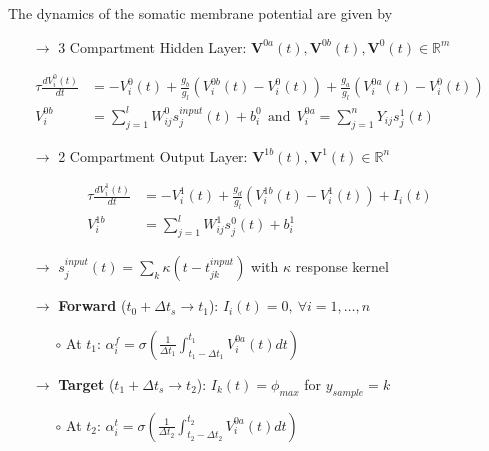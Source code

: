 \documentclass[colorinlistoftodos]{article}
\theoremstyle{definition}
\def\R{\mathbb{R}}
\begin{document}
The dynamics of the somatic membrane potential are given by

\begin{itemize}
	\item[$\to$] 3 Compartment Hidden Layer: $\mathbf{V}^{0a}(t), \mathbf{V}^{0b}(t), \mathbf{V}^{0}(t) \in \R^m$
\end{itemize}	
	\begin{align*}
		\tau \frac{dV_i^0(t)}{dt} &= -V_i^0(t) + \frac{g_b}{g_l}\left(V_i^{0b}(t) - V_i^0(t)\right) +\frac{g_a}{g_l}\left(V_i^{0a}(t) - V_i^0(t)\right)\\
		V_i^{0b} &= \sum_{j=1}^l W_{ij}^0 s_j^{input}(t) + b_i^0 \ \ \text{and} \ \ V_i^{0a} = \sum_{j=1}^n Y_{ij} s^1_j(t)
	\end{align*}
\begin{itemize}

	\item[$\to$] 2 Compartment Output Layer: $\mathbf{V}^{1b}(t), \mathbf{V}^{1}(t) \in \R^n$
\end{itemize}
\begin{align*}
		\tau \frac{dV_i^1(t)}{dt} &= -V_i^1(t) + \frac{g_d}{g_l}\left(V_i^{1b}(t) - V_i^1(t) \right) + I_i(t)\\
		V_i^{1b} &= \sum_{j=1}^l W_{ij}^1 s_j^{0}(t) + b_i^1
\end{align*}
\begin{itemize}
	\item[$\to$] $s_j^{input}(t) = \sum_k \kappa(t-t_{jk}^{input})$ with $\kappa$ response kernel
	\end{itemize}
	
\begin{itemize}
	\item[$\to$] \textbf{Forward} ($t_0 + \Delta t_s \to t_1$): $I_i(t) = 0, \ \forall i=1,\dots, n$
	\begin{itemize}
		\item[$\circ$] At $t_1$: $\alpha_i^f = \sigma\left(\frac{1}{\Delta t_1} \int_{t_1 - \Delta t_1}^{t_1} V_i^{0a}(t)dt\right)$
	\end{itemize}
	\item[$\to$] \textbf{Target} ($t_1 + \Delta t_s \to t_2$): $I_k(t) = \phi_{max}$ for $y_{sample} = k$
	\begin{itemize}
		\item[$\circ$] At $t_2$: $\alpha_i^t = \sigma\left(\frac{1}{\Delta t_2} \int_{t_2 - \Delta t_2}^{t_2} V_i^{0a}(t)dt\right)$
	\end{itemize}
\end{itemize}
\end{document}
